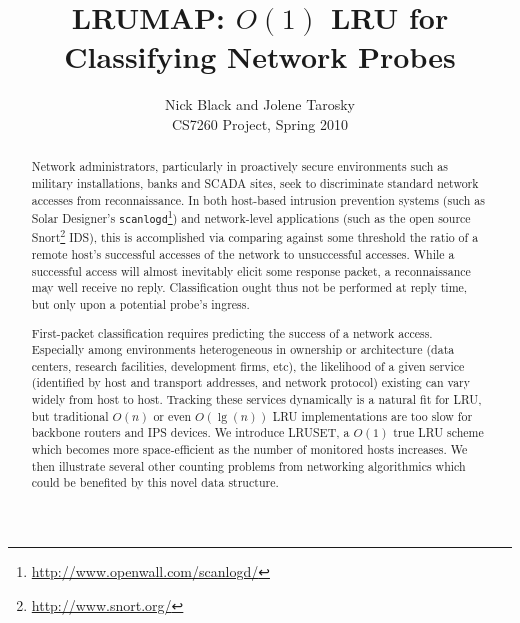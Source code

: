 \documentclass[letterpaper,10pt]{article}
\title{LRUMAP: $O(1)$ LRU for Classifying Network Probes}
\author{Nick Black and Jolene Tarosky\\
CS7260 Project, Spring 2010}
\date{}
\begin{document}
\maketitle

\begin{abstract}
Network administrators, particularly in proactively secure environments such
as military installations, banks and SCADA sites, seek to discriminate standard
network accesses from reconnaissance. In both host-based intrusion prevention
systems (such as Solar Designer's \texttt{scanlogd}\footnote{\url{http://www.openwall.com/scanlogd/}})
and network-level applications (such as the open source Snort\footnote{\url{http://www.snort.org/}} IDS),
this is accomplished via comparing against some threshold the ratio of a remote
host's successful accesses of the network to unsuccessful accesses. While a
successful access will almost inevitably elicit some response packet, a
reconnaissance may well receive no reply. Classification ought thus not be performed
at reply time, but only upon a potential probe's ingress.

First-packet classification requires predicting the success of a network access.
Especially among environments heterogeneous in ownership or architecture (data centers, research facilities,
development firms, etc), the likelihood of a given service (identified by host
and transport addresses, and network protocol) existing can vary widely from
host to host. Tracking these services dynamically is a natural fit for LRU, but
traditional $O(n)$ or even $O(\lg{(n)})$ LRU implementations are too slow for
backbone routers and IPS devices. We introduce LRUSET, a $O(1)$ true LRU scheme
which becomes more space-efficient as the number of monitored hosts increases.
We then illustrate several other counting problems from networking algorithmics
which could be benefited by this novel data structure.
\end{abstract}
\end{document}
